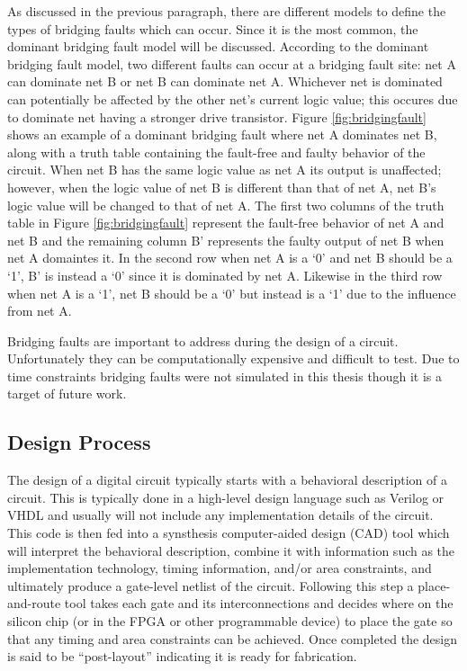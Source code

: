 \documentclass[12pt]{report}
\begin{document}
As discussed in the previous paragraph, there are different models to define the types of bridging faults which can occur.  Since it is the most common, the dominant bridging fault model will be discussed.  According to the dominant bridging fault model, two different faults can occur at a bridging fault site: net A can dominate net B or net B can dominate net A.  Whichever net is dominated can potentially be affected by the other net's current logic value; this occures due to dominate net having a stronger drive transistor\cite{needed-bridging}.  Figure \ref{fig:bridgingfault} shows an example of a dominant bridging fault where net A dominates net B, along with a truth table containing the fault-free and faulty behavior of the circuit.  When net B has the same logic value as net A its output is unaffected; however, when the logic value of net B is different than that of net A, net B's logic value will be changed to that of net A\cite{needed-bridging}.  The first two columns of the truth table in Figure \ref{fig:bridgingfault} represent the fault-free behavior of net A and net B and the remaining column B' represents the faulty output of net B when net A domaintes it. 
In the second row when net A is a `0' and net B should be a `1', B' is instead a `0' since it is dominated by net A.  Likewise in the third row when net A is a `1', net B should be a `0' but instead is a `1' due to the influence from net A.

Bridging faults are important to address during the design of a circuit.  Unfortunately they can be computationally expensive and difficult to test.  Due to time constraints bridging faults were not simulated in this thesis though it is a target of future work.

\subsection{Design Process}
\label{sct:designprocess}
The design of a digital circuit typically starts with a behavioral description of a circuit.  This is typically done in a high-level design language such as Verilog or VHDL and usually will not include any implementation details of the circuit.  This code is then fed into a synsthesis computer-aided design (CAD) tool which will interpret the behavioral description, combine it with information such as the implementation technology, timing information, and/or area constraints, and ultimately produce a gate-level netlist of the circuit.  Following this step a place-and-route tool takes each gate and its interconnections and decides where on the silicon chip (or in the FPGA or other programmable device) to place the gate so that any timing and area constraints can be achieved.  Once completed the design is said to be ``post-layout'' indicating it is ready for fabrication.
\end{document}
